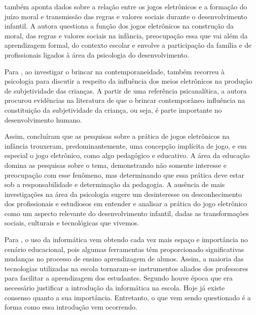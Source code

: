 \documentclass[article,12pt,openany,oneside,a4paper,english,brazil]{abntex2}
\begin{document}
 também aponta dados sobre a relação entre os jogos eletrônicos e a formação do juízo moral e transmissão das regras e valores sociais durante o desenvolvimento infantil. A autora questiona a função dos jogos eletrônicos na construção da moral, das regras e valores sociais na infância, preocupação essa que vai além da aprendizagem formal, do contexto escolar e envolve a participação da família e de profissionais ligados à área da psicologia do desenvolvimento.

Para , ao investigar o brincar na contemporaneidade, também recorreu à psicologia para discutir a respeito da influência dos meios eletrônicos na produção de subjetividade das crianças. A partir de uma referência psicanalítica, a autora procurou evidências na literatura de que o brincar contemporâneo influência na constituição da subjetividade da criança, ou seja, é parte importante no desenvolvimento humano.

Assim,  concluíram que as pesquisas sobre a prática de jogos eletrônicos na infância trouxeram, predominantemente, uma concepção implícita de jogo, e em especial o jogo eletrônico, como algo pedagógico e educativo. A área da educação domina as pesquisas sobre o tema, demonstrando não somente interesse e preocupação com esse fenômeno, mas determinando que essa prática deve estar sob a responsabilidade e determinação da pedagogia. A ausência de mais investigações na área da psicologia sugere um desinteresse ou desconhecimento dos profissionais e estudiosos em entender e analisar a prática do jogo eletrônico como um aspecto relevante do desenvolvimento infantil, dadas as transformações sociais, culturais e tecnológicas que vivemos.

Para , o uso da informática vem obtendo cada vez mais espaço e importância no cenário educacional, pois algumas ferramentas têm proporcionado significativas mudanças no processo de ensino aprendizagem de alunos. Assim, a maioria das tecnologias utilizadas na escola tornaram-se instrumentos aliados dos professores para facilitar a aprendizagem dos estudantes. Segundo  houve época que era necessário justificar a introdução da informática na escola. Hoje já existe consenso quanto a sua importância. Entretanto, o que vem sendo questionado é a forma como essa introdução vem ocorrendo.
\end{document}

